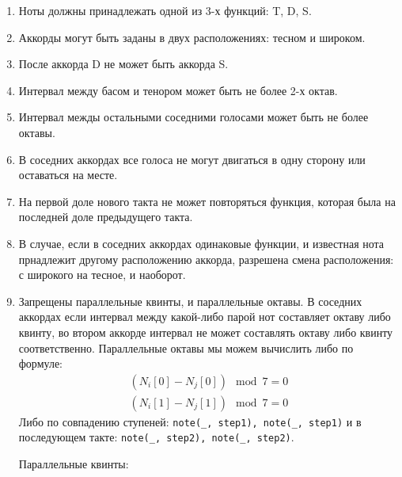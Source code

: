 \documentclass[12pt]{article}
\begin{document}
\begin{enumerate}
\item Ноты должны принадлежать одной из 3-х функций: T, D, S.
\item Аккорды могут быть заданы в двух расположениях: тесном и широком.
\item После аккорда D не может быть аккорда S.
\item Интервал между басом и тенором может быть не более 2-х октав.
\item Интервал межды остальными соседними голосами может быть не более октавы.
\item В соседних аккордах все голоса не могут двигаться в одну сторону или оставаться на месте.
\item На первой доле нового такта не может повторяться функция, которая была на последней доле предыдущего такта.
\item В случае, если в соседних аккордах одинаковые функции, и известная нота прнадлежит другому расположению аккорда, разрешена смена расположения: с широкого на тесное, и наоборот.
\item Запрещены параллельные квинты, и параллельные октавы. В соседних аккордах если интервал между какой-либо парой нот составляет октаву либо квинту, во втором аккорде интервал не может составлять октаву либо квинту соответственно.
  Параллельные октавы мы можем вычислить либо по формуле:
  \begin{equation}
    \begin{aligned}
      (N_i[0] - N_j[0]) \mod 7 = 0\\
      (N_i[1] - N_j[1]) \mod 7 = 0
    \end{aligned}
  \end{equation}
  Либо по совпадению ступеней: {\tt note(\_, step1), note(\_, step1)} и в последующем такте: {\tt note(\_, step2), note(\_, step2)}.

  Параллельные квинты:
\end{enumerate}
\end{document}
